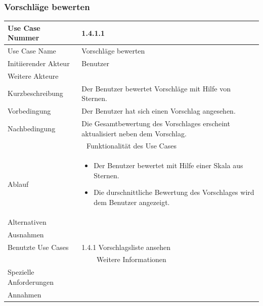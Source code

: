 \documentclass[10pt,a4paper]{article}
\begin{document}
	\subsubsection{Vorschl\"age bewerten}
	\begin{tabular}{|l|p{.5\linewidth}|}
		\hline Use Case Nummer & 1.4.1.1 \\ 
		\hline Use Case Name & Vorschl\"age bewerten \\ 
		\hline Initiierender Akteur & Benutzer \\
		\hline Weitere Akteure & \\
		\hline Kurzbeschreibung & Der Benutzer bewertet Vorschl\"age mit Hilfe von Sternen. \\
		\hline Vorbedingung & Der Benutzer hat sich einen Vorschlag angesehen. \\
		\hline Nachbedingung & Die Gesamtbewertung des Vorschlages erscheint aktualisiert neben dem Vorschlag. \\
		\hline \multicolumn{2}{|c|}{Funktionalität des Use Cases}\\
		\hline Ablauf & \begin{itemize}
			\item Der Benutzer bewertet mit Hilfe einer Skala aus Sternen.
			\item Die durschnittliche Bewertung des Vorschlages wird dem Benutzer angezeigt.
		\end{itemize} \\
		\hline Alternativen &  \\
		\hline Ausnahmen &  \\
		\hline Benutzte Use Cases & 1.4.1 Vorschlagsliste ansehen \\
		\hline \multicolumn{2}{|c|}{Weitere Informationen} \\
		\hline Spezielle Anforderungen &  \\
		\hline Annahmen &  \\
		\hline
	\end{tabular}
	
\end{document}
